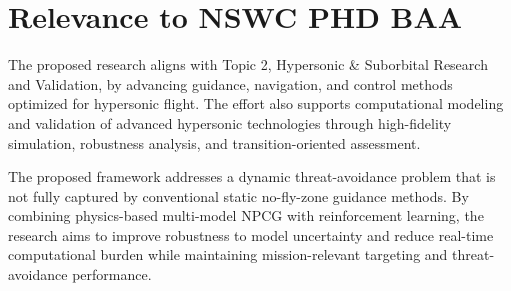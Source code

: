 \section{Relevance to NSWC PHD BAA}

The proposed research aligns with Topic 2, Hypersonic \& Suborbital Research and Validation, by advancing guidance, navigation, and control methods optimized for hypersonic flight. The effort also supports computational modeling and validation of advanced hypersonic technologies through high-fidelity simulation, robustness analysis, and transition-oriented assessment.

The proposed framework addresses a dynamic threat-avoidance problem that is not fully captured by conventional static no-fly-zone guidance methods. By combining physics-based multi-model NPCG with reinforcement learning, the research aims to improve robustness to model uncertainty and reduce real-time computational burden while maintaining mission-relevant targeting and threat-avoidance performance.
